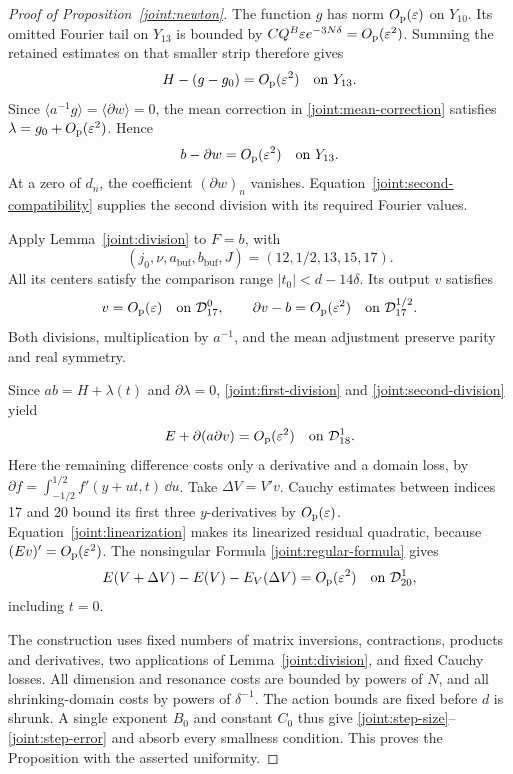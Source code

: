 \begin{proof}[Proof of Proposition~\ref{joint:newton}]
The function \(g\) has norm \(O_{\mathrm p}(\varepsilon)\) on \(Y_{10}\).
Its omitted Fourier tail on \(Y_{13}\) is bounded by
\(CQ^B\varepsilon e^{-3N\delta}=O_{\mathrm p}(\varepsilon^2)\).  Summing the
retained estimates on that smaller strip therefore gives
\[
 H-(g-g_0)=O_{\mathrm p}(\varepsilon^2)\quad\hbox{on }Y_{13}.
\]
Since \(\langle a^{-1}g\rangle=\langle\partial w\rangle=0\), the
mean correction in \eqref{joint:mean-correction} satisfies
\(\lambda=g_0+O_{\mathrm p}(\varepsilon^2)\).  Hence
\begin{equation}
 b-\partial w=O_{\mathrm p}(\varepsilon^2)\quad\hbox{on }Y_{13}.
 \label{joint:second-compatibility}
\end{equation}
At a zero of \(d_n\), the coefficient \((\partial w)_n\) vanishes.
Equation~\eqref{joint:second-compatibility} supplies the second division
with its required Fourier values.

Apply Lemma~\ref{joint:division} to \(F=b\), with
\[
 (j_0,\nu,a_{\mathrm{buf}},b_{\mathrm{buf}},J)=(12,1/2,13,15,17).
\]
All its centers satisfy the comparison range \(|t_0|<d-14\delta\).
Its output \(v\) satisfies
\begin{equation}
 v=O_{\mathrm p}(\varepsilon)\quad\hbox{on }\mathcal D_{17}^{0},
 \qquad
 \partial v-b=O_{\mathrm p}(\varepsilon^2)
       \quad\hbox{on }\mathcal D_{17}^{1/2}.
 \label{joint:second-division}
\end{equation}
Both divisions, multiplication by \(a^{-1}\), and the mean adjustment
preserve parity and real symmetry.

Since \(ab=H+\lambda(t)\) and \(\partial\lambda=0\),
\eqref{joint:first-division} and \eqref{joint:second-division} yield
\[
 E+\partial(a\partial v)=O_{\mathrm p}(\varepsilon^2)
       \quad\hbox{on }\mathcal D_{18}^{1}.
\]
Here the remaining difference costs only a derivative and a domain
loss, by
\(\partial f=\int_{-1/2}^{1/2}f'(y+ut,t)\,\dd u\).
Take \(\Delta V=V'v\).  Cauchy estimates between indices 17 and 20
bound its first three \(y\)-derivatives by
\(O_{\mathrm p}(\varepsilon)\).  Equation~\eqref{joint:linearization} makes
its linearized residual quadratic, because
\((Ev)'=O_{\mathrm p}(\varepsilon^2)\).  The nonsingular Formula
\eqref{joint:regular-formula} gives
\[
 E(V+\Delta V)-E(V)-E_V(\Delta V)=O_{\mathrm p}(\varepsilon^2)
       \quad\hbox{on }\mathcal D_{20}^{1},
\]
including \(t=0\).

The construction uses fixed numbers of matrix inversions, contractions,
products and derivatives, two applications of Lemma~\ref{joint:division},
and fixed Cauchy losses.  All dimension and resonance costs are bounded
by powers of \(N\), and all shrinking-domain costs by powers of
\(\delta^{-1}\).  The action bounds are fixed before \(d\) is shrunk.
A single exponent \(B_0\) and constant \(C_0\) thus give
\eqref{joint:step-size}--\eqref{joint:step-error} and absorb every
smallness condition.  This proves the Proposition with the asserted
uniformity.
\end{proof}

